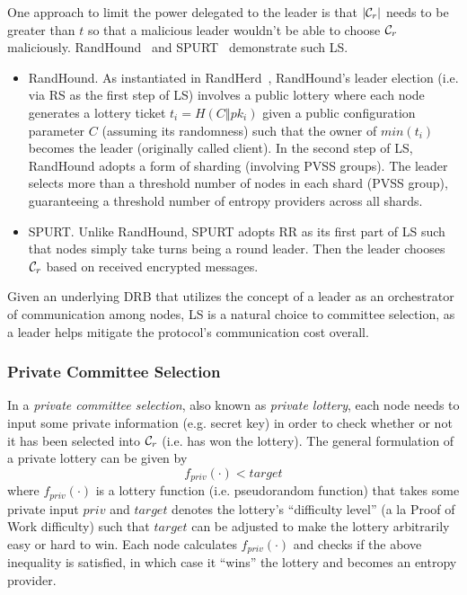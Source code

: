 One approach to limit the power delegated to the leader is that $|\mathcal{C}_r|$ needs to be greater than $t$ so that a malicious leader wouldn't be able to choose $\mathcal{C}_r$ maliciously. RandHound~\cite{syta2017scalable} and SPURT~\cite{das2021spurt} demonstrate such LS.
\begin{itemize}
\item RandHound. As instantiated in RandHerd~\cite{syta2017scalable}, RandHound's leader election (i.e. via RS as the first step of LS) involves a public lottery where each node generates a lottery ticket $t_i = H(C \mathbin\Vert pk_i)$ given a public configuration parameter $C$ (assuming its randomness) such that the owner of $min(t_i)$ becomes the leader (originally called client). In the second step of LS, RandHound adopts a form of sharding (involving PVSS groups). The leader selects more than a threshold number of nodes in each shard (PVSS group), guaranteeing a threshold number of entropy providers across all shards.
\item SPURT. Unlike RandHound, SPURT adopts RR as its first part of LS such that nodes simply take turns being a round leader. Then the leader chooses $\mathcal{C}_r$ based on received encrypted messages.
\end{itemize}

Given an underlying DRB that utilizes the concept of a leader as an orchestrator of communication among nodes, LS is a natural choice to committee selection, as a leader helps mitigate the protocol's communication cost overall.

\subsubsection{Private Committee Selection}
\label{subsubsection:private-committee-selection}
In a \textit{private committee selection}, also known as \textit{private lottery}, each node needs to input some private information (e.g. secret key) in order to check whether or not it has been selected into $\mathcal{C}_r$ (i.e. has won the lottery). The general formulation of a private lottery can be given by
\[
f_{priv}(\cdot) < target
\]
where $f_{priv}(\cdot)$ is a lottery function (i.e. pseudorandom function) that takes some private input $priv$ and $target$ denotes the lottery's ``difficulty level'' (a la Proof of Work difficulty) such that $target$ can be adjusted to make the lottery arbitrarily easy or hard to win. Each node calculates $f_{priv}(\cdot)$ and checks if the above inequality is satisfied, in which case it ``wins'' the lottery and becomes an entropy provider.

